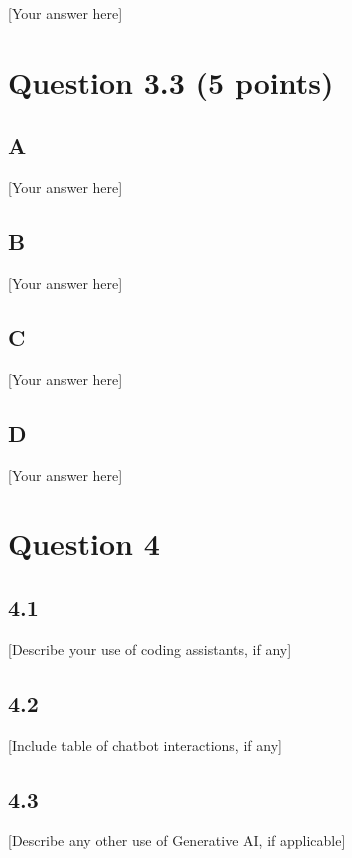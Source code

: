 \documentclass{article}
\begin{document}
[Your answer here] 

\section*{Question 3.3 (5 points)}

\subsection*{A} [Your answer here] 

\subsection*{B} [Your answer here] 

\subsection*{C} [Your answer here] 

\subsection*{D} [Your answer here] 


\section*{Question 4}

\subsection*{4.1}
[Describe your use of coding assistants, if any]

\subsection*{4.2}
[Include table of chatbot interactions, if any]

\subsection*{4.3}
[Describe any other use of Generative AI, if applicable]
\end{document}
